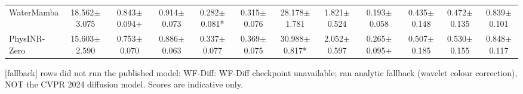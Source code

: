 \documentclass[journal]{IEEEtran}
\begin{document}
\begin{table}
{\begin{tabular}{lccccccccccc}
WaterMamba & 18.562$\pm$3.075 & 0.843$\pm$0.094+ & 0.914$\pm$0.073 & 0.282$\pm$0.081* & 0.315$\pm$0.076 & 28.178$\pm$1.781 & 1.821$\pm$0.524 & 0.193$\pm$0.058 & 0.435$\pm$0.148 & 0.472$\pm$0.135 & 0.839$\pm$0.101 \\
PhysINR-Zero & 15.603$\pm$2.590 & 0.753$\pm$0.070 & 0.886$\pm$0.063 & 0.337$\pm$0.077 & 0.369$\pm$0.075 & 30.988$\pm$0.817* & 2.052$\pm$0.597 & 0.265$\pm$0.095+ & 0.507$\pm$0.185 & 0.530$\pm$0.155 & 0.848$\pm$0.117 \\
\bottomrule
\end{tabular}
}
\par\smallskip\footnotesize [fallback] rows did not run the published model:
WF-Diff: WF-Diff checkpoint unavailable; ran analytic fallback (wavelet colour correction), NOT the CVPR 2024 diffusion model. Scores are indicative only.
\end{table}
\end{document}
